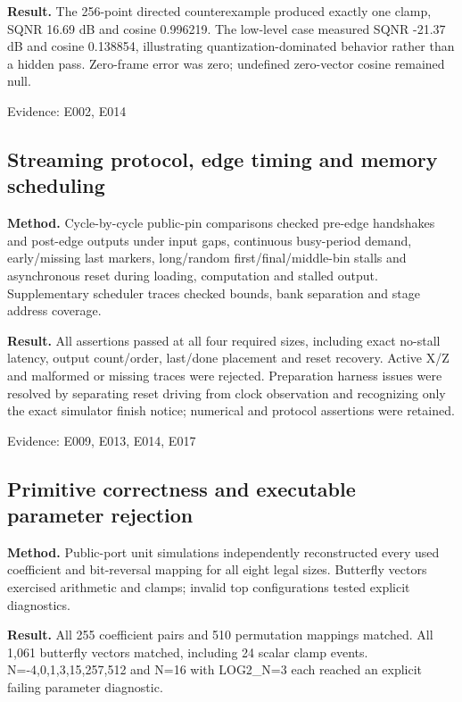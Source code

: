 \documentclass[11pt,a4paper]{article}
\begin{document}
\textbf{Result.} The 256-point directed counterexample produced exactly one clamp,\allowbreak{} SQNR 16.69 dB and cosine 0.996219. The low-level case measured SQNR -21.37 dB and cosine 0.138854,\allowbreak{} illustrating quantization-dominated behavior rather than a hidden pass. Zero-frame error was zero; undefined zero-vector cosine remained null.

{\small Evidence: E002,\allowbreak{} E014}

\subsection{Streaming protocol,\allowbreak{} edge timing and memory scheduling}

\textbf{Method.} Cycle-by-cycle public-pin comparisons checked pre-edge handshakes and post-edge outputs under input gaps,\allowbreak{} continuous busy-period demand,\allowbreak{} early/\allowbreak{}missing last markers,\allowbreak{} long/\allowbreak{}random first/\allowbreak{}final/\allowbreak{}middle-bin stalls and asynchronous reset during loading,\allowbreak{} computation and stalled output. Supplementary scheduler traces checked bounds,\allowbreak{} bank separation and stage address coverage.

\textbf{Result.} All assertions passed at all four required sizes,\allowbreak{} including exact no-stall latency,\allowbreak{} output count/\allowbreak{}order,\allowbreak{} last/\allowbreak{}done placement and reset recovery. Active X/\allowbreak{}Z and malformed or missing traces were rejected. Preparation harness issues were resolved by separating reset driving from clock observation and recognizing only the exact simulator finish notice; numerical and protocol assertions were retained.

{\small Evidence: E009,\allowbreak{} E013,\allowbreak{} E014,\allowbreak{} E017}

\subsection{Primitive correctness and executable parameter rejection}

\textbf{Method.} Public-port unit simulations independently reconstructed every used coefficient and bit-reversal mapping for all eight legal sizes. Butterfly vectors exercised arithmetic and clamps; invalid top configurations tested explicit diagnostics.

\textbf{Result.} All 255 coefficient pairs and 510 permutation mappings matched. All 1,\allowbreak{}061 butterfly vectors matched,\allowbreak{} including 24 scalar clamp events. N=\allowbreak{}-4,\allowbreak{}0,\allowbreak{}1,\allowbreak{}3,\allowbreak{}15,\allowbreak{}257,\allowbreak{}512 and N=\allowbreak{}16 with LOG2\_\allowbreak{}N=\allowbreak{}3 each reached an explicit failing parameter diagnostic.
\end{document}
